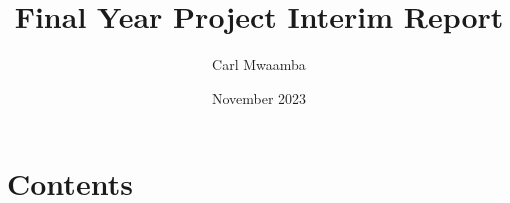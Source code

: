 \documentclass{article}
\title{Final Year Project Interim Report}
\author{Carl Mwaamba}
\date{November 2023}
\begin{document}
\maketitle

\section{Contents}
\end{document}
